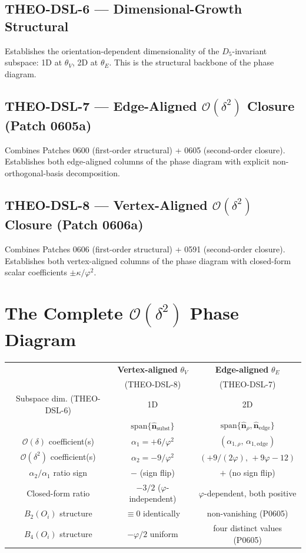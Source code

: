 \documentclass[11pt]{article}
\begin{document}
\subsection*{THEO-DSL-6 --- Dimensional-Growth Structural}
Establishes the orientation-dependent dimensionality of the
$D_5$-invariant subspace: 1D at $\theta_V$, 2D at $\theta_E$. This is
the structural backbone of the phase diagram.

\subsection*{THEO-DSL-7 --- Edge-Aligned $\mathcal{O}(\delta^2)$ Closure (Patch 0605a)}
Combines Patches 0600 (first-order structural) + 0605 (second-order
closure). Establishes both edge-aligned columns of the phase diagram
with explicit non-orthogonal-basis decomposition.

\subsection*{THEO-DSL-8 --- Vertex-Aligned $\mathcal{O}(\delta^2)$ Closure (Patch 0606a)}
Combines Patches 0606 (first-order structural) + 0591 (second-order
closure). Establishes both vertex-aligned columns of the phase diagram
with closed-form scalar coefficients $\pm \kappa/\varphi^2$.

\section{The Complete $\mathcal{O}(\delta^2)$ Phase Diagram}

\begin{center}
\begin{tabular}{c|c|c}
\hline
 & \textbf{Vertex-aligned} $\theta_V$ & \textbf{Edge-aligned} $\theta_E$ \\
 & (THEO-DSL-8) & (THEO-DSL-7) \\
\hline
Subspace dim. (THEO-DSL-6) & 1D & 2D \\
& $\mathrm{span}\{\hat{\mathbf{n}}_{\text{subst}}\}$
& $\mathrm{span}\{\hat{\mathbf{n}}_\rho,\hat{\mathbf{n}}_{\text{edge}}\}$ \\[4pt]
$\mathcal{O}(\delta)$ coefficient(s)
& $\alpha_1 = +6/\varphi^2$
& $(\alpha_{1,\rho},\,\alpha_{1,\text{edge}})$ \\[2pt]
$\mathcal{O}(\delta^2)$ coefficient(s)
& $\alpha_2 = -9/\varphi^2$
& $(+9/(2\varphi),\,+9\varphi-12)$ \\[4pt]
$\alpha_2/\alpha_1$ ratio sign
& $-$ (sign flip)
& $+$ (no sign flip) \\[2pt]
Closed-form ratio
& $-3/2$ ($\varphi$-independent)
& $\varphi$-dependent, both positive \\[4pt]
$B_2(O_i)$ structure
& $\equiv 0$ identically
& non-vanishing (P0605) \\[2pt]
$B_4(O_i)$ structure
& $-\varphi/2$ uniform
& four distinct values (P0605) \\
\hline
\end{tabular}
\end{center}
\end{document}
